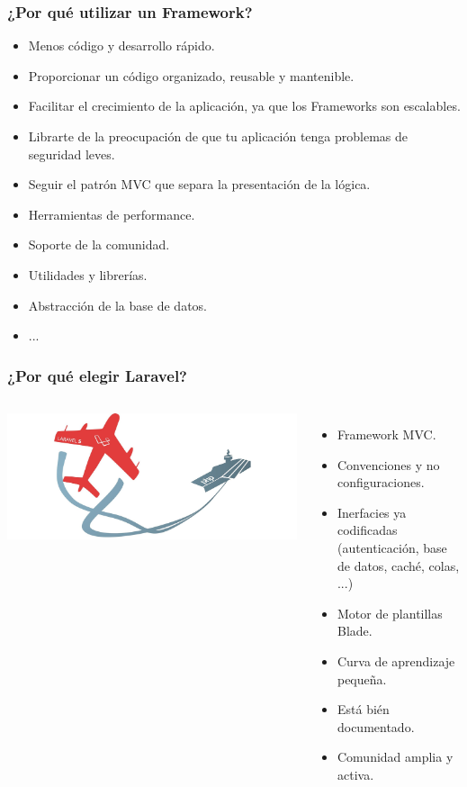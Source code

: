 \documentclass{beamer} %
\begin{document}
\begin{frame}
  \frametitle{¿Por qué utilizar un Framework?}
  \begin{itemize}[<+-| alert@+>]
  \item Menos código y desarrollo rápido.
  \item Proporcionar un código organizado, reusable y mantenible.
  \item Facilitar el crecimiento de la aplicación, ya que los Frameworks son escalables.
  \item Librarte de la preocupación de que tu aplicación tenga problemas de seguridad leves.
  \item Seguir el patrón MVC que separa la presentación de la lógica.
  \item Herramientas de performance.
  \item Soporte de la comunidad.
  \item Utilidades y librerías.
  \item Abstracción de la base de datos.
  \item ...
  \end{itemize}
\end{frame}

\begin{frame}
  \frametitle{¿Por qué elegir Laravel?}
  \begin{columns}
    \begin{center}
      \includegraphics[scale=0.21]{laravel1}
    \end{center}    
    \begin{itemize}[<+-| alert@+>]
    \item Framework MVC.
    \item Convenciones y no configuraciones.
    \item Inerfacies ya codificadas (autenticación, base de datos, caché, colas, ...)
    \item Motor de plantillas Blade.
    \item Curva de aprendizaje pequeña.
    \item Está bién documentado.
    \item Comunidad amplia y activa.
    \end{itemize}
    \end{columns}
\end{frame}
\end{document}
